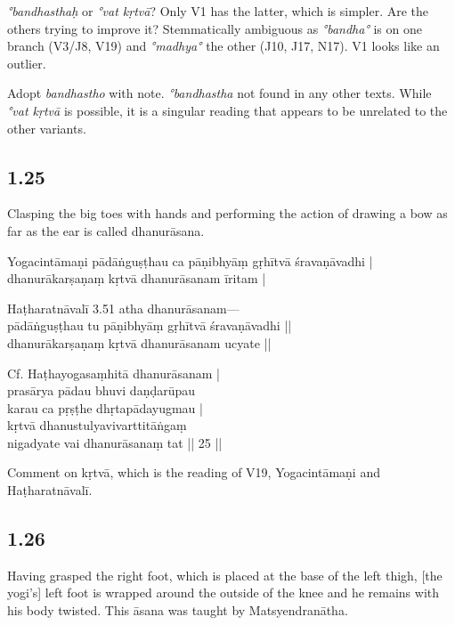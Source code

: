 \begin{ekdosis}
\begin{philcomm}[hp01_024]
\emph{°bandhasthaḥ} or \emph{°vat kṛtvā}? Only V1 has the latter, which is simpler. Are the others trying to improve it? Stemmatically ambiguous as \emph{°bandha°} is on one branch (V3/J8, V19) and \emph{°madhya°} the other (J10, J17, N17). V1 looks like an outlier.

Adopt \emph{bandhastho} with note. \emph{°bandhastha} not found in any other texts. While \emph{°vat kṛtvā} is possible, it is a singular reading that appears to be unrelated to the other variants.
\end{philcomm}

\subsection*{1.25}
\begin{translation}[hp01_025]
Clasping the big toes with hands and performing the action of drawing a bow as far as the ear is called dhanurāsana.
\end{translation}

\begin{testimonia}[hp01_025]
Yogacintāmaṇi
\startverse
pādāṅguṣṭhau ca pāṇibhyāṃ gṛhītvā śravaṇāvadhi |\\
dhanurākarṣaṇaṃ kṛtvā dhanurāsanam īritam |
\endverse

Haṭharatnāvalī 3.51
\startverse
atha dhanurāsanam---\\
pādāṅguṣṭhau tu pāṇibhyāṃ gṛhītvā śravaṇāvadhi ||\\
dhanurākarṣaṇaṃ kṛtvā dhanurāsanam ucyate ||
\endverse

Cf. Haṭhayogasaṃhitā
\startverse
dhanurāsanam |\\
prasārya pādau bhuvi daṇḍarūpau \\
karau ca pṛṣṭhe dhṛtapādayugmau |\\
kṛtvā dhanustulyavivarttitāṅgaṃ \\
nigadyate vai dhanurāsanaṃ tat || 25 ||
\endverse
\end{testimonia}

\begin{philcomm}[hp01_025]
Comment on kṛtvā, which is the reading of V19, Yogacintāmaṇi and Haṭharatnāvalī.
\end{philcomm}

\subsection*{1.26}
\begin{translation}[hp01_026]
Having grasped the right foot, which is placed at the base of the left thigh, [the yogi’s] left foot is wrapped around the outside of the knee and he remains with his body twisted. This āsana was taught by Matsyendranātha.
\end{translation}


\end{ekdosis}
